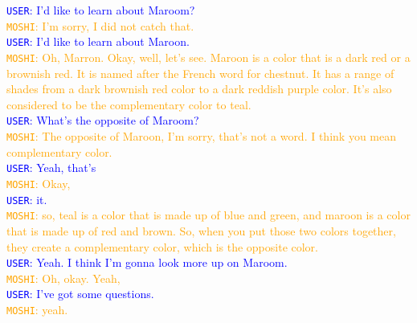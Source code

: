 \begin{tcolorbox}
\textcolor{blue}{\texttt{USER}: I'd like to learn about Maroom?} \\
\textcolor{orange}{\texttt{MOSHI}: I'm sorry, I did not catch that.} \\
\textcolor{blue}{\texttt{USER}: I'd like to learn about Maroon.} \\
\textcolor{orange}{\texttt{MOSHI}: Oh, Marron. Okay, well, let's see. Maroon is a color that is a dark red or a brownish red. It is named after the French word for chestnut. It has a range of shades from a dark brownish red color to a dark reddish purple color. It's also considered to be the complementary color to teal.} \\
\textcolor{blue}{\texttt{USER}: What's the opposite of Maroom?} \\
\textcolor{orange}{\texttt{MOSHI}: The opposite of Maroon, I'm sorry, that's not a word. I think you mean complementary color.} \\
\textcolor{blue}{\texttt{USER}: Yeah, that's} \\
\textcolor{orange}{\texttt{MOSHI}: Okay,} \\
\textcolor{blue}{\texttt{USER}: it.} \\
\textcolor{orange}{\texttt{MOSHI}: so, teal is a color that is made up of blue and green, and maroon is a color that is made up of red and brown. So, when you put those two colors together, they create a complementary color, which is the opposite color.} \\
\textcolor{blue}{\texttt{USER}: Yeah. I think I'm gonna look more up on Maroom.} \\
\textcolor{orange}{\texttt{MOSHI}: Oh, okay. Yeah,} \\
\textcolor{blue}{\texttt{USER}: I've got some questions.} \\
\textcolor{orange}{\texttt{MOSHI}: yeah.} \\
\end{tcolorbox}

